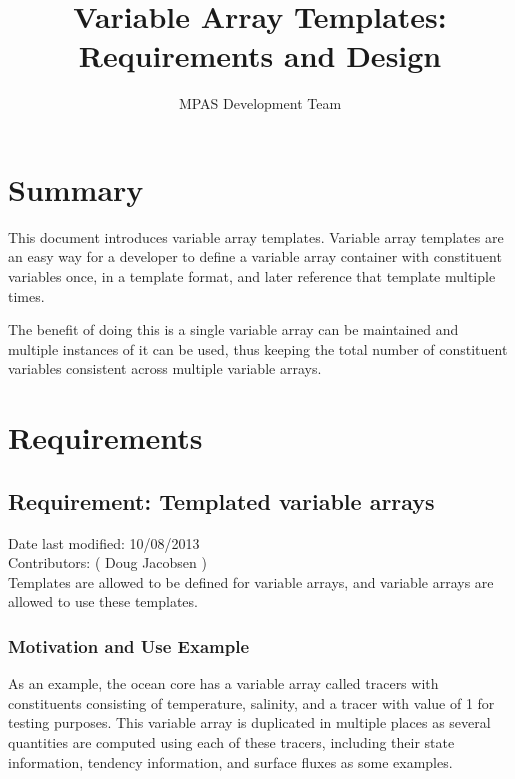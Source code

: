 \documentclass[11pt]{report}
\begin{document}
\title{Variable Array Templates: \\
Requirements and Design}
\author{MPAS Development Team}

\maketitle
\tableofcontents


\chapter{Summary}

This document introduces variable array templates. Variable array templates are
an easy way for a developer to define a variable array container with
constituent variables once, in a template format, and later reference that
template multiple times.

The benefit of doing this is a single variable array can be maintained and
multiple instances of it can be used, thus keeping the total number of
constituent variables consistent across multiple variable arrays.



\chapter{Requirements}

\section{Requirement: Templated variable arrays}
Date last modified: 10/08/2013 \\
Contributors: ( Doug Jacobsen ) \\

Templates are allowed to be defined for variable arrays, and variable arrays
are allowed to use these templates.

\subsection{Motivation and Use Example}
As an example, the ocean core has a variable array called tracers with
constituents consisting of temperature, salinity, and a tracer with value of 1
for testing purposes. This variable array is duplicated in multiple places as
several quantities are computed using each of these tracers, including their
state information, tendency information, and surface fluxes as some examples.
\end{document}
